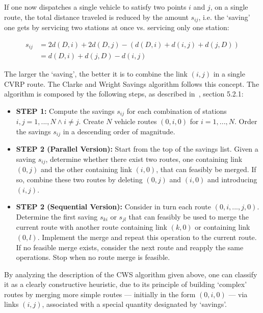 If one now dispatches a single vehicle to satisfy two points $i$ and $j$, on a 
single route, the total distance traveled is reduced by the amount $s_{ij}$, i.e. 
the `saving' one gets by servicing two stations at once vs. servicing only 
one station:

\begin{equation*}
\begin{split}
s_{ij}  &= 2d(D,i) + 2d(D,j) - (d(D,i) + d(i,j) + d(j,D))\\
        &= d(D,i) + d(j,D) - d(i,j)
\end{split}
\end{equation*}\vertbreak

The larger the `saving', the better it is to combine the link $(i,j)$ in a single 
CVRP route. The Clarke and Wright Savings algorithm follows this concept. The 
algorithm is composed by the following steps, as described in~\cite{Toth2002}, 
section 5.2.1:

\begin{itemize}

    \item \textbf{STEP 1:} Compute the savings $s_{ij}$ for each combination of 
            stations $i, j = 1, ..., N \wedge i \neq j$. Create $N$ vehicle 
            routes $(0,i,0)$ for $i = 1, ..., N$. Order the savings $s_{ij}$ in 
            a descending order of magnitude.
    \item \textbf{STEP 2 (Parallel Version):} Start from the top of the 
            savings list. Given a saving $s_{ij}$, determine whether there 
            exist two routes, one containing link $(0,j)$ and the other 
            containing link $(i, 0)$, that can feasibly be merged. If so, 
            combine these two routes by deleting $(0,j)$ and $(i,0)$ and 
            introducing $(i,j)$.
    \item \textbf{STEP 2 (Sequential Version):} Consider in turn each route 
            $(0,i,...,j,0)$. Determine the first saving $s_{ki}$ or $s_{jl}$ 
            that can 
            feasibly be used to merge the current route with another route 
            containing link $(k, 0)$ or containing link $(0, l)$. 
            Implement the merge and repeat this operation to the current route. 
            If no feasible merge exists, consider the next route and reapply 
            the same operations. Stop when no route merge is feasible.
\end{itemize}\vertbreak

By analyzing the description of the CWS algorithm given above, one can classify 
it as a clearly constructive heuristic, due to its principle of building 
`complex' routes by merging more simple routes --- initially in the form 
$(0,i,0)$ --- via links $(i,j)$, associated with a special quantity designated 
by `savings'.

